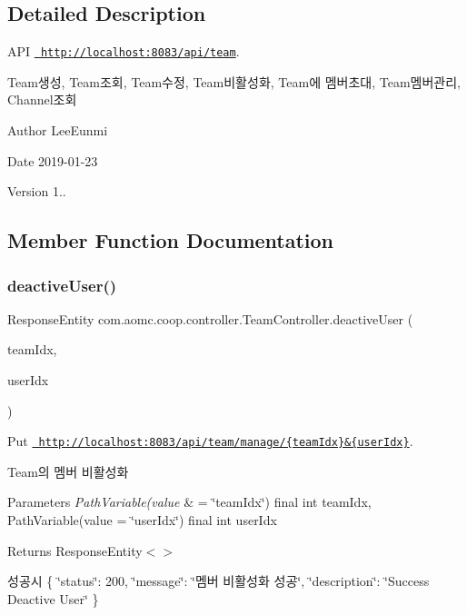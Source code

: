 \subsection{Detailed Description}
A\+PI \href{http://localhost:8083/api/team}{\texttt{ http\+://localhost\+:8083/api/team}}. 

Team생성, Team조회, Team수정, Team비활성화, Team에 멤버초대, Team멤버관리, Channel조회 \begin{DoxyAuthor}{Author}
Lee\+Eunmi 
\end{DoxyAuthor}
\begin{DoxyDate}{Date}
2019-\/01-\/23 
\end{DoxyDate}
\begin{DoxyVersion}{Version}
1.. 
\end{DoxyVersion}


\subsection{Member Function Documentation}
\mbox{\label{classcom_1_1aomc_1_1coop_1_1controller_1_1_team_controller_a0458b6213d34ba925524eaf1471961fd}} 
\subsubsection{\texorpdfstring{deactiveUser()}{deactiveUser()}}
{\footnotesize\ttfamily Response\+Entity com.\+aomc.\+coop.\+controller.\+Team\+Controller.\+deactive\+User (\begin{DoxyParamCaption}\item[{@Path\+Variable(value=\char`\"{}team\+Idx\char`\"{}) final int}]{team\+Idx,  }\item[{@Path\+Variable(value=\char`\"{}user\+Idx\char`\"{}) final int}]{user\+Idx }\end{DoxyParamCaption})}



Put \href{http://localhost:8083/api/team/manage/{teamIdx}&{userIdx}}{\texttt{ http\+://localhost\+:8083/api/team/manage/\{team\+Idx\}\&\{user\+Idx\}}}. 

Team의 멤버 비활성화


\begin{DoxyParams}{Parameters}
{\em Path\+Variable(value} & = \char`\"{}team\+Idx\char`\"{}) final int team\+Idx, Path\+Variable(value = \char`\"{}user\+Idx\char`\"{}) final int user\+Idx\\
\hline
\end{DoxyParams}
\begin{DoxyReturn}{Returns}
Response\+Entity$<$$>$
\end{DoxyReturn}
성공시 \{ \char`\"{}status\char`\"{}\+: 200, \char`\"{}message\char`\"{}\+: \char`\"{}멤버 비활성화 성공\char`\"{}, \char`\"{}description\char`\"{}\+: \char`\"{}\+Success Deactive User\char`\"{} \}

